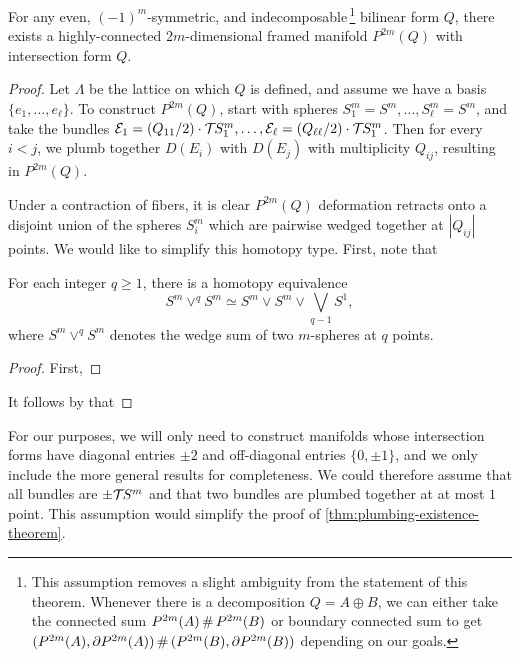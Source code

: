 \begin{theorem}\label{thm:plumbing-existence-theorem}
	For any even, $(-1)^m$-symmetric, and indecomposable\,\footnote{This assumption removes a slight ambiguity from the statement of this theorem. Whenever there is a decomposition $Q=A\oplus B$, we can either take the connected sum $P^{2m}(A)\+P^{2m}(B)$ or boundary connected sum to get $(P^{2m}(A),\partial P^{2m}(A))\+ (P^{2m}(B),\partial P^{2m}(B))$ depending on our goals.} bilinear form $Q$, there exists a highly-connected $2m$-dimensional framed manifold $P^{2m}(Q)$ with intersection form $Q$.
\end{theorem}

\begin{proof}
	Let $\Lambda$ be the lattice on which $Q$ is defined, and assume we have a basis $\{e_1,\ldots, e_\ell\}$. To construct $P^{2m}(Q)$, start with spheres $S_1^m=S^m,\ldots, S_\ell^m=S^m$, and take the bundles $\mathcal{E}_1=(Q_{11}/2)\cdot {\mathcal{T}\hspace{-0.1em}} S^m_1,\ldots, \mathcal{E}_\ell=(Q_{\ell\ell}/2)\cdot {\mathcal{T}\hspace{-0.1em}} S^m_1$. Then for every $i<j$, we plumb together $D(E_i)$ with $D(E_j)$ with multiplicity $Q_{ij}$, resulting in $P^{2m}(Q)$.

	Under a contraction of fibers, it is clear $P^{2m}(Q)$ deformation retracts onto a disjoint union of the spheres $S^m_i$ which are pairwise wedged together at $|Q_{ij}|$ points. We would like to simplify this homotopy type. First, note that
	\begin{lemma}
		For each integer $q\geq 1$, there is a homotopy equivalence
		\[
			S^m\vee^q S^m \simeq S^m\vee S^m \vee \bigvee_{q-1} S^1,
		\]
		where $S^m\vee^q S^m$ denotes the wedge sum of two $m$-spheres at $q$ points.
	\end{lemma}
	\begin{proof}
		First,
	\end{proof}

	It follows by that

\end{proof}

\begin{remark}
	For our purposes, we will only need to construct manifolds whose intersection forms have diagonal entries $\pm 2$ and off-diagonal entries $\{0,\pm 1\}$, and we only include the more general results for completeness. We could therefore assume that all bundles are $\pm {\mathcal{T}\hspace{-0.1em}} S^m$ and that two bundles are plumbed together at at most $1$ point. This assumption would simplify the proof of \cref{thm:plumbing-existence-theorem}.
\end{remark}


